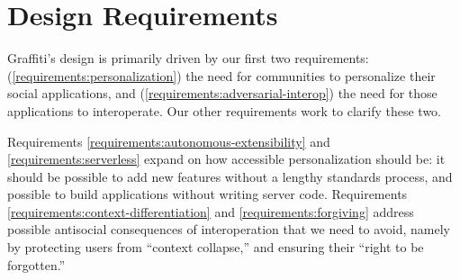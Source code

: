 \newtheorem{requirement}{Requirement}

\section{Design Requirements}
\label{requirements}

Graffiti's design is primarily driven by our
first two requirements:
(\ref{requirements:personalization})
the need for communities to personalize
their social applications,
and (\ref{requirements:adversarial-interop})
the need for those applications to interoperate.
Our other requirements work to clarify these two.

Requirements \ref{requirements:autonomous-extensibility}
and \ref{requirements:serverless} expand on how accessible
personalization should be: it should be possible to add new features
without a lengthy standards process, and possible to build
applications without writing server code.
Requirements \ref{requirements:context-differentiation}
and \ref{requirements:forgiving}
address possible antisocial consequences of
interoperation that we need to avoid,
namely by protecting users from ``context collapse,''
and ensuring their ``right to be forgotten.''







